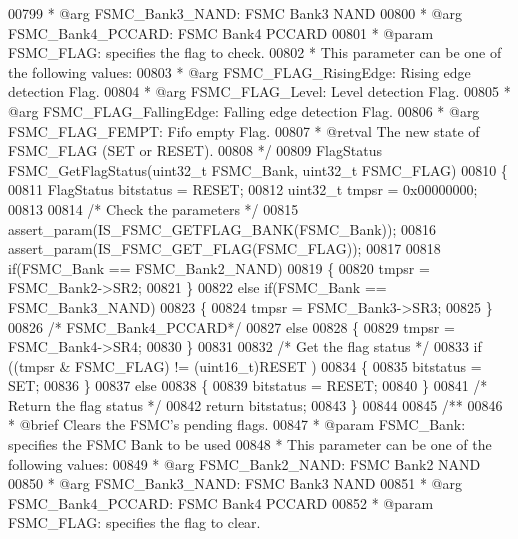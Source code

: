 \begin{DoxyCode}
00799 \textcolor{comment}{  *            @arg FSMC\_Bank3\_NAND: FSMC Bank3 NAND}
00800 \textcolor{comment}{  *            @arg FSMC\_Bank4\_PCCARD: FSMC Bank4 PCCARD}
00801 \textcolor{comment}{  * @param  FSMC\_FLAG: specifies the flag to check.}
00802 \textcolor{comment}{  *          This parameter can be one of the following values:}
00803 \textcolor{comment}{  *            @arg FSMC\_FLAG\_RisingEdge: Rising edge detection Flag.}
00804 \textcolor{comment}{  *            @arg FSMC\_FLAG\_Level: Level detection Flag.}
00805 \textcolor{comment}{  *            @arg FSMC\_FLAG\_FallingEdge: Falling edge detection Flag.}
00806 \textcolor{comment}{  *            @arg FSMC\_FLAG\_FEMPT: Fifo empty Flag. }
00807 \textcolor{comment}{  * @retval The new state of FSMC\_FLAG (SET or RESET).}
00808 \textcolor{comment}{  */}
00809 FlagStatus FSMC_GetFlagStatus(uint32\_t FSMC\_Bank, uint32\_t FSMC\_FLAG)
00810 \{
00811   FlagStatus bitstatus = RESET;
00812   uint32\_t tmpsr = 0x00000000;
00813 
00814   \textcolor{comment}{/* Check the parameters */}
00815   assert_param(IS\_FSMC\_GETFLAG\_BANK(FSMC\_Bank));
00816   assert_param(IS\_FSMC\_GET\_FLAG(FSMC\_FLAG));
00817 
00818   \textcolor{keywordflow}{if}(FSMC\_Bank == FSMC_Bank2_NAND)
00819   \{
00820     tmpsr = FSMC_Bank2->SR2;
00821   \}
00822   \textcolor{keywordflow}{else} \textcolor{keywordflow}{if}(FSMC\_Bank == FSMC_Bank3_NAND)
00823   \{
00824     tmpsr = FSMC_Bank3->SR3;
00825   \}
00826   \textcolor{comment}{/* FSMC\_Bank4\_PCCARD*/}
00827   \textcolor{keywordflow}{else}
00828   \{
00829     tmpsr = FSMC_Bank4->SR4;
00830   \}
00831 
00832   \textcolor{comment}{/* Get the flag status */}
00833   \textcolor{keywordflow}{if} ((tmpsr & FSMC\_FLAG) != (uint16\_t)RESET )
00834   \{
00835     bitstatus = SET;
00836   \}
00837   \textcolor{keywordflow}{else}
00838   \{
00839     bitstatus = RESET;
00840   \}
00841   \textcolor{comment}{/* Return the flag status */}
00842   \textcolor{keywordflow}{return} bitstatus;
00843 \}
00844 
00845 \textcolor{comment}{/**}
00846 \textcolor{comment}{  * @brief  Clears the FSMC's pending flags.}
00847 \textcolor{comment}{  * @param  FSMC\_Bank: specifies the FSMC Bank to be used}
00848 \textcolor{comment}{  *          This parameter can be one of the following values:}
00849 \textcolor{comment}{  *            @arg FSMC\_Bank2\_NAND: FSMC Bank2 NAND }
00850 \textcolor{comment}{  *            @arg FSMC\_Bank3\_NAND: FSMC Bank3 NAND}
00851 \textcolor{comment}{  *            @arg FSMC\_Bank4\_PCCARD: FSMC Bank4 PCCARD}
00852 \textcolor{comment}{  * @param  FSMC\_FLAG: specifies the flag to clear.}

\end{DoxyCode}
